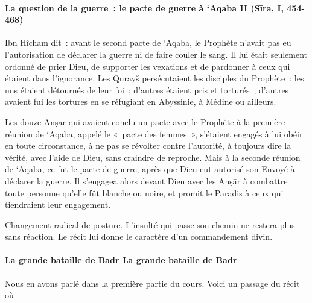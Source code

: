 \paragraph{La question de la guerre~: le pacte de guerre à `Aqaba II
(Sīra, I,
454-468)}

{Ibn Hîcham dit~: avant le second pacte de `Aqaba, le Prophète
n'avait pas eu l'autorisation de déclarer la guerre ni de faire couler
le sang. Il lui était seulement ordonné de prier Dieu, de supporter les
vexations et de pardonner à ceux qui étaient dans l'ignorance. Les
Qurayš persécutaient les disciples du Prophète~: les uns étaient
détournés de leur foi~; d'autres étaient pris et torturés~; d'autres
avaient fui les tortures en se réfugiant en Abyssinie, à Médine ou
ailleurs.}

{Les douze Anṣār qui avaient conclu un pacte avec} {le
Prophète à la première réunion de `Aqaba, appelé le «~pacte des
femmes~», s'étaient engagés à lui obéir en toute circonstance, à ne pas
se révolter contre l'autorité, à toujours dire la vérité, avec l'aide de
Dieu, sans craindre de reproche. Mais à la seconde réunion de `Aqaba, ce
fut le pacte de guerre, après que Dieu eut autorisé son Envoyé à
déclarer la guerre. Il s'engagea alors devant Dieu avec les Anṣār à
combattre toute personne qu'elle fût blanche ou noire, et promit le
Paradis à ceux qui tiendraient leur engagement.}

Changement radical de posture. L'insulté qui passe son chemin ne restera
plus sans réaction. Le récit lui donne le caractère d'un commandement
divin.


\paragraph{{La grande bataille de Badr
}{La grande bataille de Badr }}

Nous en avons parlé dans la première partie du cours. Voici un passage
du récit où

